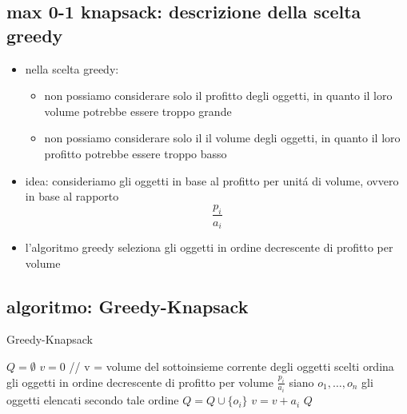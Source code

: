 \subsection*{max 0-1 knapsack: descrizione della scelta greedy}
\begin{flushleft}
	\begin{itemize}
		\item nella scelta greedy:
		\begin{itemize}
			\item non possiamo considerare solo il profitto degli oggetti, in quanto il loro volume potrebbe essere troppo grande
			\item non possiamo considerare solo il il volume degli oggetti, in quanto il loro profitto potrebbe essere troppo basso
		\end{itemize}
		\item idea: consideriamo gli oggetti in base al profitto per unit\'a di volume, ovvero in base al rapporto $$\frac{p_i}{a_i}$$
		\item l'algoritmo greedy seleziona gli oggetti in ordine decrescente di profitto per volume
	\end{itemize}
\end{flushleft}


\newpage
\subsection*{algoritmo: Greedy-Knapsack}
\begin{flushleft}
	\begin{algorithm}
		\caption{Greedy-Knapsack}
		\begin{algorithmic}
			\STATE $Q=\emptyset$
			\STATE $v=0$
			\STATE \color{gray} // v = volume del sottoinsieme corrente degli oggetti scelti \color{black}
			\STATE ordina gli oggetti in ordine decrescente di profitto per volume $\frac{p_i}{a_i}$
			\STATE siano $o_1,\ldots,o_n$ gli oggetti elencati secondo tale ordine
					\STATE $Q=Q\cup\{o_i\}$
					\STATE $v=v+a_i$
				\ENDIF
			\ENDFOR
			\RETURN $Q$
		\end{algorithmic}
	\end{algorithm}
\end{flushleft}

